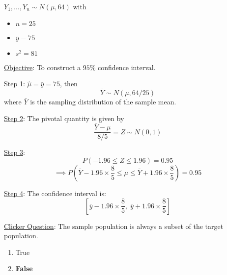 \begin{Example}{}{}
    $ Y_1,\ldots ,Y_n \sim N(\mu,64) $ with
    \begin{itemize}
        \item $ n=25 $
        \item $ \bar{y}=75 $
        \item $ s^2=81 $
    \end{itemize}
    \underline{Objective}: To construct a $ 95\% $ confidence interval.

    \underline{Step 1}: $ \hat{\mu}=\bar{y}=75 $, then
    \[ \bar{Y} \sim N(\mu,64/25) \]
    where $ \bar{Y} $ is the sampling distribution of the sample mean.

    \underline{Step 2}: The pivotal quantity is given by
    \[ \frac{\bar{Y}-\mu}{8/5} =Z \sim N(0,1) \]

    \underline{Step 3}:
    \[ P\left(-1.96\leqslant Z\leqslant 1.96\right)=0.95 \]
    \[ \implies P\left( \bar{Y}-1.96\times \frac{8}{5} \leqslant \mu
        \leqslant \bar{Y}+1.96\times \frac{8}{5} \right)=0.95 \]

    \underline{Step 4}: The confidence interval is:
    \[ \left[ \bar{y}-1.96\times \frac{8}{5},\;\bar{y}+1.96\times \frac{8}{5} \right] \]
\end{Example}


\underline{Clicker Question}: The sample population is always a subset of the target
population.
\begin{enumerate}[label=(\alph*)]
    \item True
    \item \textbf{False}
\end{enumerate}
